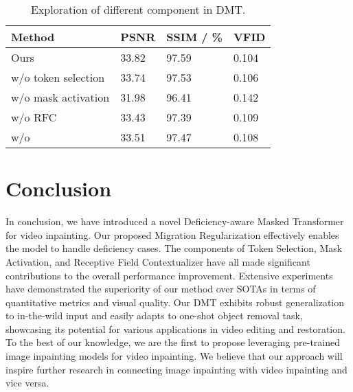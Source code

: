 \documentclass[10pt,twocolumn,letterpaper]{article}
\begin{document}
\begin{table}[t]
\centering
\caption{Exploration of different component in DMT. }
\label{tab:ablation}
\small
\begin{tabular}{llll}
\toprule \rowcolor{TableHead}
Method   & PSNR & SSIM / \% & VFID  \\ \midrule \rowcolor{RowColor}
Ours    & 33.82       & 97.59 & 0.104    \\ \midrule
w/o token selection   & 33.74\textcolor{othercolor}{}
& 97.53\textcolor{othercolor}{}
& 0.106\textcolor{othercolor}{}    \\
w/o mask activation & 31.98\textcolor{othercolor}{} &
	96.41\textcolor{othercolor}{} &
	0.142\textcolor{othercolor}{}
   \\
w/o RFC & 33.43\textcolor{othercolor}{} &
	97.39\textcolor{othercolor}{} &
	0.109\textcolor{othercolor}{}
   \\
w/o  & 33.51\textcolor{othercolor}{} &
	97.47\textcolor{othercolor}{} &
	0.108\textcolor{othercolor}{}
   \\

 \bottomrule
\end{tabular}
\end{table}




 

\section{Conclusion}

In conclusion, we have introduced a novel Deficiency-aware Masked Transformer for video inpainting. Our proposed Migration Regularization effectively enables the model to handle deficiency cases. The components of Token Selection, Mask Activation, and Receptive Field Contextualizer have all made significant contributions to the overall performance improvement.
Extensive experiments have demonstrated the superiority of our method over SOTAs in terms of quantitative metrics and visual quality. Our DMT exhibits robust generalization to in-the-wild input and easily adapts to one-shot object removal task, showcasing its potential for various applications in video editing and restoration.
To the best of our knowledge, we are the first to propose leveraging pre-trained image inpainting models for video inpainting. We believe that our approach will inspire further research in connecting image inpainting with video inpainting and vice versa.
\end{document}
